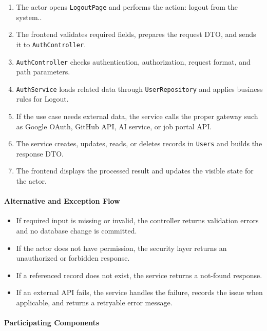 \begin{enumerate}
    \item The actor opens \texttt{LogoutPage} and performs the action: logout from the system..
    \item The frontend validates required fields, prepares the request DTO, and sends it to \texttt{AuthController}.
    \item \texttt{AuthController} checks authentication, authorization, request format, and path parameters.
    \item \texttt{AuthService} loads related data through \texttt{UserRepository} and applies business rules for Logout.
    \item If the use case needs external data, the service calls the proper gateway such as Google OAuth, GitHub API, AI service, or job portal API.
    \item The service creates, updates, reads, or deletes records in \texttt{Users} and builds the response DTO.
    \item The frontend displays the processed result and updates the visible state for the actor.
\end{enumerate}

\paragraph{Alternative and Exception Flow}

\begin{itemize}
    \item If required input is missing or invalid, the controller returns validation errors and no database change is committed.
    \item If the actor does not have permission, the security layer returns an unauthorized or forbidden response.
    \item If a referenced record does not exist, the service returns a not-found response.
    \item If an external API fails, the service handles the failure, records the issue when applicable, and returns a retryable error message.
\end{itemize}

\paragraph{Participating Components}

